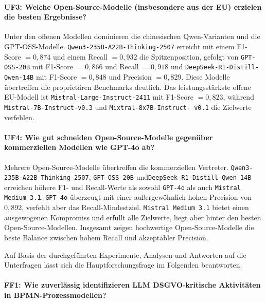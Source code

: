 \paragraph{UF3: Welche Open-Source-Modelle (insbesondere aus der EU) erzielen die besten Ergebnisse?}

Unter den offenen Modellen dominieren die chinesischen Qwen-Varianten und die GPT-OSS-Modelle. \texttt{Qwen3-235B-A22B-Thinking-2507} erreicht mit einem F1-Score $= 0{,}874$ und einem Recall $= 0{,}932$ die Spitzenposition, gefolgt von \texttt{GPT-OSS-20B} mit F1-Score $= 0{,}866$ und Recall $= 0{,}918$ und \texttt{DeepSeek-R1-Distill-Qwen-14B} mit F1-Score $= 0{,}848$ und Precision $= 0{,}829$. Diese Modelle übertreffen die proprietären Benchmarks deutlich. Das leistungsstärkste offene \ac{EU}-Modell ist \texttt{Mistral-Large-Instruct-2411} mit F1-Score $= 0{,}823$, während \texttt{Mistral-7B-Instruct-v0.3} und \texttt{Mixtral-8x7B-Instruct-\linebreak~v0.1} die Zielwerte verfehlen.

\paragraph{UF4: Wie gut schneiden Open-Source-Modelle gegenüber kommerziellen Modellen wie GPT-4o ab?}

Mehrere Open-Source-Modelle übertreffen die kommerziellen Vertreter. \texttt{Qwen3-235B-A22B-Thinking-2507}, \texttt{GPT-OSS-20B} und\linebreak\texttt{DeepSeek-R1-Distill-Qwen-14B} erreichen höhere F1- und Recall-Werte als sowohl \texttt{GPT-4o} als auch \texttt{Mistral Medium 3.1}. \texttt{GPT-4o} überzeugt mit einer außergewöhnlich hohen Precision von $0{,}892$, verfehlt aber das Recall-Mindestziel. \texttt{Mistral Medium 3.1} bietet einen ausgewogenen Kompromiss und erfüllt alle Zielwerte, liegt aber hinter den besten Open-Source-Modellen. Insgesamt zeigen hochwertige Open-Source-Modelle die beste Balance zwischen hohem Recall und akzeptabler Precision.

Auf Basis der durchgeführten Experimente, Analysen und Antworten auf die Unterfragen lässt sich die Hauptforschungsfrage im Folgenden beantworten.

\paragraph{FF1: Wie zuverlässig identifizieren LLM DSGVO-kritische Aktivitäten in BPMN-Prozessmodellen?}


